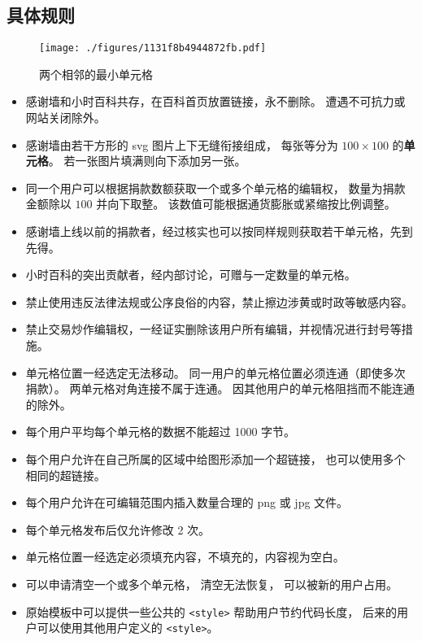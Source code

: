 
\begin{issues}
\issueDraft
{}
\end{issues}

\subsection{具体规则}

\begin{figure}[ht]
\centering
\texttt{[image: ./figures/1131f8b4944872fb.pdf]}
\caption{两个相邻的最小单元格} \label{fig_thanks_1}
\end{figure}

\begin{itemize}
\item 感谢墙和小时百科共存，在百科首页放置链接，永不删除。 遭遇不可抗力或网站关闭除外。
\item 感谢墙由若干方形的 svg 图片上下无缝衔接组成， 每张等分为 $100\times 100$ 的\textbf{单元格}。 若一张图片填满则向下添加另一张。
\item 同一个用户可以根据捐款数额获取一个或多个单元格的编辑权， 数量为捐款金额除以 $100$ 并向下取整。 该数值可能根据通货膨胀或紧缩按比例调整。
\item 感谢墙上线以前的捐款者，经过核实也可以按同样规则获取若干单元格，先到先得。
\item 小时百科的突出贡献者，经内部讨论，可赠与一定数量的单元格。
\item 禁止使用违反法律法规或公序良俗的内容，禁止擦边涉黄或时政等敏感内容。
\item 禁止交易炒作编辑权，一经证实删除该用户所有编辑，并视情况进行封号等措施。
\item 单元格位置一经选定无法移动。 同一用户的单元格位置必须连通（即使多次捐款）。 两单元格对角连接不属于连通。 因其他用户的单元格阻挡而不能连通的除外。
\item 每个用户平均每个单元格的数据不能超过 1000 字节。
\item 每个用户允许在自己所属的区域中给图形添加一个超链接， 也可以使用多个相同的超链接。
\item 每个用户允许在可编辑范围内插入数量合理的 png 或 jpg 文件。
\item 每个单元格发布后仅允许修改 2 次。
\item 单元格位置一经选定必须填充内容，不填充的，内容视为空白。
\item 可以申请清空一个或多个单元格， 清空无法恢复， 可以被新的用户占用。
\item 原始模板中可以提供一些公共的 \verb`<style>` 帮助用户节约代码长度， 后来的用户可以使用其他用户定义的 \verb`<style>`。
\end{itemize}

